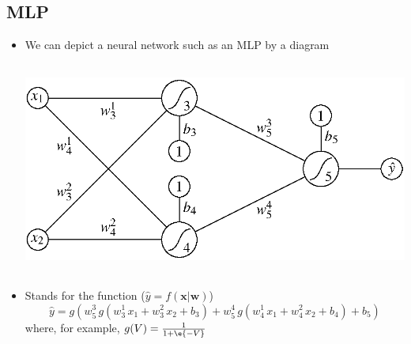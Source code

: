 \begin{slide}
\section[-1.5]{MLP}

\begin{PauseHighLight}

\begin{itemize}
\item We can depict a neural network such as an MLP by a diagram
  \begin{center}
    \includegraphics[height=7cm]{mlp-simple.eps}\pause
  \end{center}
\item Stands for the function ($\hat{y} = f(\bm{x}|\bm{w})$)
  \begin{displaymath}
    \hat{y} = g\!\left(w^3_5\, g(w^1_3\, x_1+w^2_3\,x_2+b_3) + w^4_5\, g(w^1_4\,
    x_1+w^2_4\,x_2+b_4) +b_5\right)
  \end{displaymath}
where, for example, $g(V) = \frac{1}{1+\e{-V}}$\pause
\end{itemize}

\end{PauseHighLight}
\end{slide}


